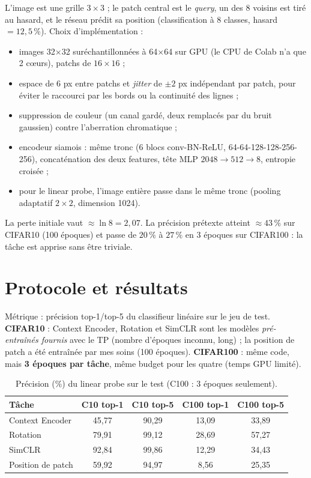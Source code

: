 \documentclass[12pt,a4paper]{article}
\begin{document}
L'image est une grille $3\times 3$ ; le patch central est le \emph{query}, un des 8 voisins est tiré au hasard, et le réseau
prédit sa position (classification à 8 classes, hasard $=12{,}5\,\%$). Choix d'implémentation :
\begin{itemize}
    \item images 32$\times$32 suréchantillonnées à 64$\times$64 sur GPU (le CPU de Colab n'a que 2 cœurs), patchs de $16\times16$ ;
    \item espace de 6 px entre patchs et \emph{jitter} de $\pm2$ px indépendant par patch, pour éviter le raccourci par les bords
    ou la continuité des lignes ;
    \item suppression de couleur (un canal gardé, deux remplacés par du bruit gaussien) contre l'aberration chromatique ;
    \item encodeur siamois : même tronc (6 blocs conv-BN-ReLU, 64-64-128-128-256-256), concaténation des deux features,
    tête MLP $2048\to512\to8$, entropie croisée ;
    \item pour le linear probe, l'image entière passe dans le même tronc (pooling adaptatif $2\times2$, dimension 1024).
\end{itemize}
La perte initiale vaut $\approx\ln 8=2{,}07$. La précision prétexte atteint $\approx43\,\%$ sur CIFAR10 (100 époques) et passe de
$20\,\%$ à $27\,\%$ en 3 époques sur CIFAR100 : la tâche est apprise sans être triviale.

\section{Protocole et résultats}

Métrique : précision top-1/top-5 du classifieur linéaire sur le jeu de test. \textbf{CIFAR10} : Context Encoder, Rotation et SimCLR sont les modèles
\emph{pré-entraînés fournis} avec le TP (nombre d'époques inconnu, long) ; la position de patch a été entraînée par mes soins (100 époques). \textbf{CIFAR100} : même code, mais \textbf{3 époques par tâche}, même budget
pour les quatre (temps GPU limité).

\begin{table}[h!]
\centering
\small
\begin{tabular}{lcccc}
\toprule
Tâche & C10 top-1 & C10 top-5 & C100 top-1 & C100 top-5 \\
\midrule
Context Encoder   & 45{,}77 & 90{,}29 & 13{,}09 & 33{,}89 \\
Rotation          & 79{,}91 & 99{,}12 & 28{,}69 & 57{,}27 \\
SimCLR            & 92{,}84 & 99{,}86 & 12{,}29 & 34{,}43 \\
Position de patch & 59{,}92 & 94{,}97 &  8{,}56 & 25{,}35 \\
\bottomrule
\end{tabular}
\caption{Précision (\%) du linear probe sur le test (C100 : 3 époques seulement).}
\end{table}
\end{document}
